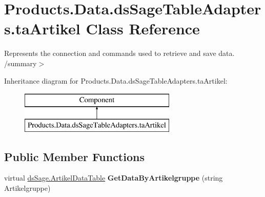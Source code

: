 \hypertarget{class_products_1_1_data_1_1ds_sage_table_adapters_1_1ta_artikel}{}\section{Products.\+Data.\+ds\+Sage\+Table\+Adapters.\+ta\+Artikel Class Reference}
\label{class_products_1_1_data_1_1ds_sage_table_adapters_1_1ta_artikel}


Represents the connection and commands used to retrieve and save data. /summary$>$  


Inheritance diagram for Products.\+Data.\+ds\+Sage\+Table\+Adapters.\+ta\+Artikel\+:\begin{figure}[H]
\begin{center}
\leavevmode
\includegraphics[height=2.000000cm]{class_products_1_1_data_1_1ds_sage_table_adapters_1_1ta_artikel}
\end{center}
\end{figure}
\subsection*{Public Member Functions}
\begin{DoxyCompactItemize}
\item 
virtual \hyperlink{class_products_1_1_data_1_1ds_sage_1_1_artikel_data_table}{ds\+Sage.\+Artikel\+Data\+Table} {\bfseries Get\+Data\+By\+Artikelgruppe} (string Artikelgruppe)\hypertarget{class_products_1_1_data_1_1ds_sage_table_adapters_1_1ta_artikel_ac81dea0eade938857d654585f3bbb5ca}{}\label{class_products_1_1_data_1_1ds_sage_table_adapters_1_1ta_artikel_ac81dea0eade938857d654585f3bbb5ca}

\end{DoxyCompactItemize}
